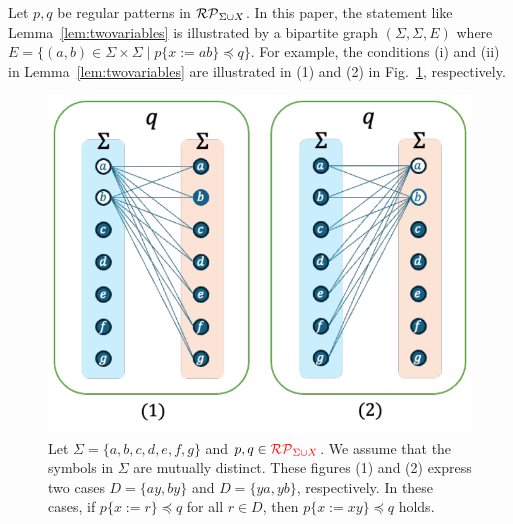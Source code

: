 
Let $p,q$ be regular patterns in {\color{red}$\mathcal{RP}_{\Sigma\cup X}$}.
In this paper, the statement like Lemma~\ref{lem:twovariables} is illustrated by a bipartite graph $(\Sigma, \Sigma, E)$ where $E = \{(a, b) \in \Sigma\times\Sigma \mid p\{x:=ab\} \preceq q\}$.
For example, the conditions (i) and (ii) in Lemma~\ref{lem:twovariables} are illustrated in (1) and (2) in Fig.~\ref{fig:lem4bigraph}, respectively.

\begin{figure}[t]
  \begin{center}
    \includegraphics[scale=0.525]{figs/lem4bigraph.pdf}
    \caption{Let $\Sigma=\{a,b,c,d,e,f,g\}$ and $p,q \in {\color{red}\mathcal{RP}_{\Sigma\cup X}}$. We assume that the symbols in $\Sigma$ are mutually distinct.
    These figures (1) and (2) express two cases $D = \{ ay, by \}$ and $D = \{ ya, yb \}$, respectively.
    In these cases, if $p \{ x := r \} \preceq q$ for all $r \in D$, then $p \{ x := xy \} \preceq q$ holds.}\label{fig:lem4bigraph}
  \end{center}
\end{figure}